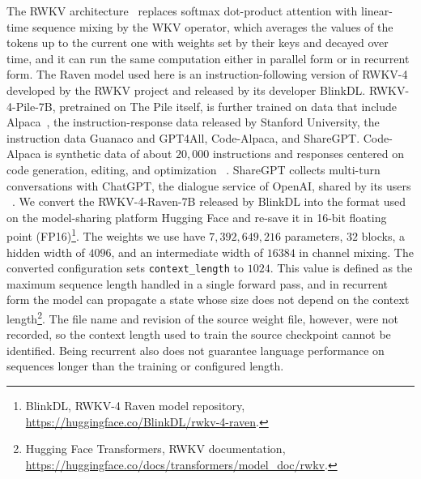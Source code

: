 \documentclass[conference]{IEEEtran}
\begin{document}
The RWKV architecture~\cite{peng-etal-2023-rwkv} replaces softmax dot-product attention with linear-time sequence mixing by the WKV operator, which
averages the values of the tokens up to the current one with weights set by their keys and decayed over time, and it can run the same computation either in parallel
form or in recurrent form. The Raven model used here is an instruction-following version of RWKV-4 developed by the RWKV project and
released by its developer BlinkDL. RWKV-4-Pile-7B, pretrained on The Pile itself, is further trained on data that
include Alpaca~\cite{alpaca}, the instruction-response data released by Stanford University, the instruction data Guanaco and GPT4All,
Code-Alpaca, and ShareGPT.
Code-Alpaca is synthetic data of about $20{,}000$ instructions and responses centered on code generation, editing, and optimization
~\cite{codealpaca}.
ShareGPT collects multi-turn conversations with ChatGPT, the dialogue service of OpenAI, shared by its users
~\cite{lmsys-fastchat}.
We convert the RWKV-4-Raven-7B released by BlinkDL into the format used on the model-sharing platform Hugging Face and re-save it in 16-bit
floating point (FP16)\footnote{BlinkDL, RWKV-4 Raven model repository,
\url{https://huggingface.co/BlinkDL/rwkv-4-raven}.}.
The weights we use have $7{,}392{,}649{,}216$ parameters, $32$ blocks, a hidden width of $4096$, and an intermediate width of $16384$ in channel mixing.
The converted configuration sets \texttt{context\_length} to $1024$. This value is defined as the maximum sequence length handled in
a single forward pass, and in recurrent form the model can propagate a state whose size does not depend on the context
length\footnote{Hugging Face Transformers, RWKV documentation,
\url{https://huggingface.co/docs/transformers/model_doc/rwkv}.}. The file name and revision of the source weight file,
however, were not recorded, so the context length used to train the source checkpoint cannot be identified. Being recurrent also
does not guarantee language performance on sequences longer than the training or configured length.
\end{document}
